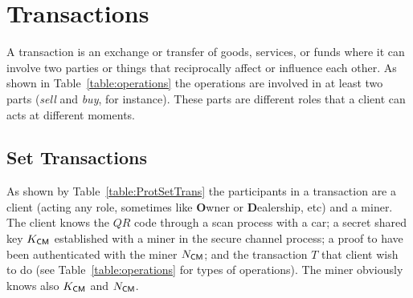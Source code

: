 \section{Transactions}
\label{sec:transactions}
A transaction is an exchange or transfer of goods, services, or funds where it can involve 
two parties or things that reciprocally affect or influence each other. 
As shown in Table~\ref{table:operations} the operations are involved in at least two parts (\textit{sell} and \textit{buy}, for instance). These parts are different roles that a client can 
acts at different moments.





\subsection{Set Transactions} 
\label{ssec:setTrans}
As shown by Table~\ref{table:ProtSetTrans} the participants in a transaction 
are a client (acting any role, sometimes like \textbf{O}wner or \textbf{D}ealership, etc) and a miner.
The client knows the $QR$ code through a scan process with
a car; a secret shared key $K_{\textsf{C}\textsf{M}}$ established with
a miner in the secure channel process; a proof to have been authenticated
with the miner $N_{\textsf{C}\textsf{M}}$; and the transaction $T$ that client wish 
to do  (see Table~\ref{table:operations} for types of operations). 
The miner obviously knows also $K_{\textsf{C}\textsf{M}}$ and $N_{\textsf{C}\textsf{M}}$. 

